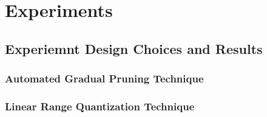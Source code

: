 



\section{Experiments}
\subsection{Experiemnt Design Choices and Results}

\subsubsection{Automated Gradual Pruning Technique}





\subsubsection{Linear Range Quantization Technique}



